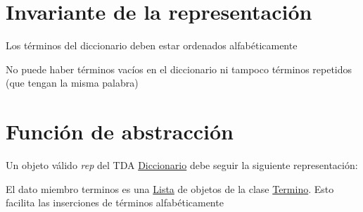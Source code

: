 \hypertarget{repDiccionario_invDiccionario}{}\section{Invariante de la representación}\label{repDiccionario_invDiccionario}

\begin{DoxyItemize}
\item Los términos del diccionario deben estar ordenados alfabéticamente
\item No puede haber términos vacíos en el diccionario ni tampoco términos repetidos (que tengan la misma palabra) 
\end{DoxyItemize}\hypertarget{repDiccionario_faDiccionario}{}\section{Función de abstracción}\label{repDiccionario_faDiccionario}
Un objeto válido {\itshape rep} del T\+DA \mbox{\hyperlink{classDiccionario}{Diccionario}} debe seguir la siguiente representación\+:
\begin{DoxyItemize}
\item El dato miembro terminos es una \mbox{\hyperlink{classLista}{Lista}} de objetos de la clase \mbox{\hyperlink{classTermino}{Termino}}. Esto facilita las inserciones de términos alfabéticamente 
\end{DoxyItemize}